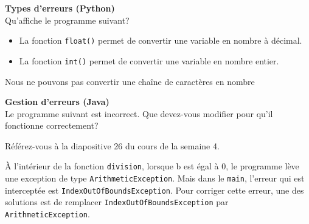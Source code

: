 \begin{Exercice}[5 minutes]\textbf{Types d'erreurs (Python)}\\
    Qu'affiche le programme suivant? 
    
    
     \begin{conseil}
        \begin{itemize}
            \item La fonction \lstinline{float()} permet de convertir une variable en nombre à décimal.
            \item La fonction \lstinline{int()} permet de convertir une variable en nombre entier.
        \end{itemize}  
    \end{conseil}

     \begin{solution}
        Nous ne pouvons pas convertir une chaîne de caractères en nombre
     \end{solution}

\end{Exercice}
 
\begin{Exercice}[5 minutes] \textbf{Gestion d'erreurs (Java)} \\
    Le programme suivant est incorrect. Que devez-vous modifier pour qu'il fonctionne correctement?
    \\
    
    

    
     \begin{conseil}
        Référez-vous à la diapositive 26 du cours de la semaine 4.       
     \end{conseil}
     \begin{solution}
        À l'intérieur de la fonction \lstinline{division}, lorsque b est égal à 0, le programme lève une exception de type \lstinline{ArithmeticException}. Mais dans le \lstinline{main}, l'erreur qui est interceptée est \lstinline{IndexOutOfBoundsException}. Pour corriger cette erreur, une des solutions est de remplacer \lstinline{IndexOutOfBoundsException} par \lstinline{ArithmeticException}.
     \end{solution}   
 \end{Exercice}


